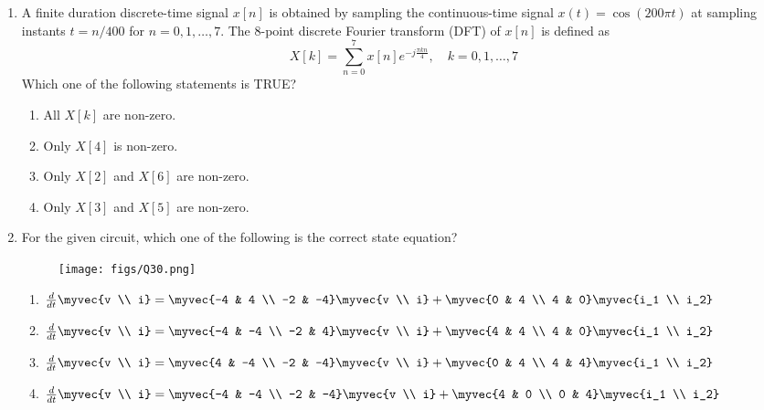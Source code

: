 \documentclass[a4paper, 11pt]{article}
\begin{document}
\begin{enumerate}
    \hfill{}
    
    \item A finite duration discrete-time signal $x[n]$ is obtained by sampling the continuous-time signal $x(t)=\cos(200\pi t)$ at sampling instants $t = n/400$ for $n=0, 1, \dots, 7$. The 8-point discrete Fourier transform (DFT) of $x[n]$ is defined as 
    $$X[k] = \sum_{n=0}^{7} x[n] e^{-j\frac{\pi kn}{4}}, \quad k=0,1,\dots,7$$
    Which one of the following statements is TRUE?
    \begin{enumerate}
        \item All $X[k]$ are non-zero.
        \item Only $X[4]$ is non-zero.
        \item Only $X[2]$ and $X[6]$ are non-zero.
        \item Only $X[3]$ and $X[5]$ are non-zero.
    \end{enumerate}

    \hfill{}

    \item For the given circuit, which one of the following is the correct state equation?
    \begin{figure}[H]
        \centering
        \texttt{[image: figs/Q30.png]}
        \caption*{}
        \label{fig:q40}
    \end{figure}
    \begin{enumerate}
        \item $\frac{d}{dt}\myvec{v \\ i} = \myvec{-4 & 4 \\ -2 & -4}\myvec{v \\ i} + \myvec{0 & 4 \\ 4 & 0}\myvec{i_1 \\ i_2}$
        \item $\frac{d}{dt}\myvec{v \\ i} = \myvec{-4 & -4 \\ -2 & 4}\myvec{v \\ i} + \myvec{4 & 4 \\ 4 & 0}\myvec{i_1 \\ i_2}$
        \item $\frac{d}{dt}\myvec{v \\ i} = \myvec{4 & -4 \\ -2 & -4}\myvec{v \\ i} + \myvec{0 & 4 \\ 4 & 4}\myvec{i_1 \\ i_2}$
        \item $\frac{d}{dt}\myvec{v \\ i} = \myvec{-4 & -4 \\ -2 & -4}\myvec{v \\ i} + \myvec{4 & 0 \\ 0 & 4}\myvec{i_1 \\ i_2}$
    \end{enumerate}


\end{enumerate}
\end{document}
